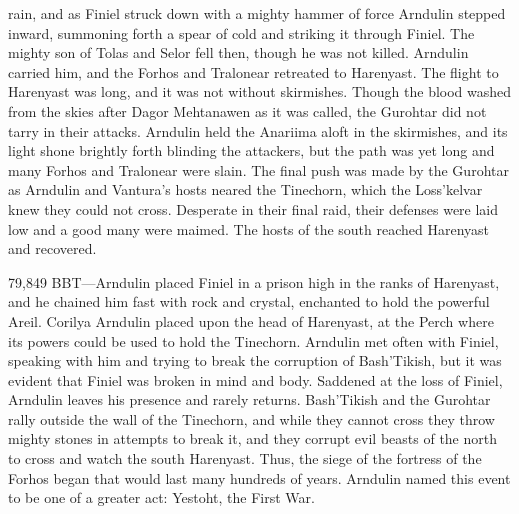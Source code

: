 \documentclass[smalldemyvopaper,11pt,twoside,onecolumn,openright,extrafontsizes]{memoir}
\begin{document}
{{rain, and as Finiel struck down with a mighty hammer of force Arndulin stepped inward, summoning forth a spear of cold and striking it through Finiel. The mighty son of Tolas and Selor fell then, though he was not killed. Arndulin carried him, and the Forhos and Tralonear retreated to Harenyast. The flight to Harenyast was long, and it was not without skirmishes. Though the blood washed from the skies after Dagor Mehtanawen as it was called, the Gurohtar did not tarry in their attacks. Arndulin held the Anariima aloft in the skirmishes, and its light shone brightly forth blinding the attackers, but the path was yet long and many Forhos and Tralonear were slain. The final push was made by the Gurohtar as Arndulin and Vantura’s hosts neared the Tinechorn, which the Loss’kelvar knew they could not cross. Desperate in their final raid, their defenses were laid low and a good many were maimed. The hosts of the south reached Harenyast and recovered.

79,849 BBT—Arndulin placed Finiel in a prison high in the ranks of Harenyast, and he chained him fast with rock and crystal, enchanted to hold the powerful Areil. Corilya Arndulin placed upon the head of Harenyast, at the Perch where its powers could be used to hold the Tinechorn. Arndulin met often with Finiel, speaking with him and trying to break the corruption of Bash’Tikish, but it was evident that Finiel was broken in mind and body. Saddened at the loss of Finiel, Arndulin leaves his presence and rarely returns. Bash’Tikish and the Gurohtar rally outside the wall of the Tinechorn, and while they cannot cross they throw mighty stones in attempts to break it, and they corrupt evil beasts of the north to cross and watch the south Harenyast. Thus, the siege of the fortress of the Forhos began that would last many hundreds of years. Arndulin named this event to be one of a greater act: Yestoht, the First War.

}}
\end{document}
